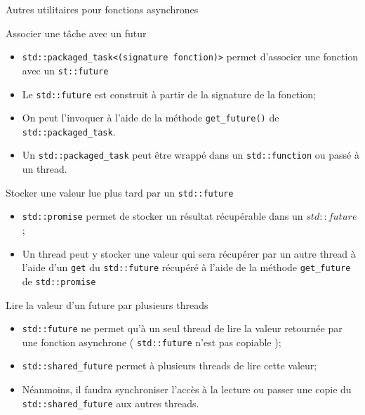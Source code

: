 \documentclass[handout,10pt]{beamer}
\begin{document}
\begin{frame}[fragile]{Autres utilitaires pour fonctions asynchrones}
 \tiny
 \begin{block}{Associer une tâche avec un futur}
  \begin{itemize}
   \item \lstinline$std::packaged_task<(signature fonction)>$ permet d'associer une fonction avec un \lstinline$st::future$
   \item Le \lstinline$std::future$ est construit à partir de la signature de la fonction;
   \item On peut l'invoquer à l'aide de la méthode \lstinline$get_future()$ de \lstinline$std::packaged_task$.
   \item Un \lstinline$std::packaged_task$ peut être wrappé dans un \lstinline$std::function$ ou passé à un thread.
  \end{itemize}
 \end{block}
 \begin{block}{Stocker une valeur lue plus tard par un \lstinline$std::future$}
  \begin{itemize}
   \item \lstinline$std::promise$ permet de stocker un résultat récupérable dans un $std::future$;
   \item Un thread peut y stocker une valeur qui sera récupérer par un autre thread à l'aide d'un \lstinline$get$ du \lstinline$std::future$ récupéré
   à l'aide de la méthode \lstinline$get_future$ de \lstinline$std::promise$
  \end{itemize}
 \end{block}
 \begin{block}{Lire la valeur d'un future par plusieurs threads}
  \begin{itemize}
   \item \lstinline$std::future$ ne permet qu'à un seul thread de lire la valeur retournée par une fonction asynchrone ( \lstinline$std::future$ n'est pas copiable );
   \item \lstinline$std::shared_future$ permet à plusieurs threads de lire cette valeur;
   \item Néanmoins, il faudra synchroniser l'accès à la lecture ou passer une copie du \lstinline$std::shared_future$ aux autres threads.
  \end{itemize}
 \end{block}
\end{frame}
\end{document}
